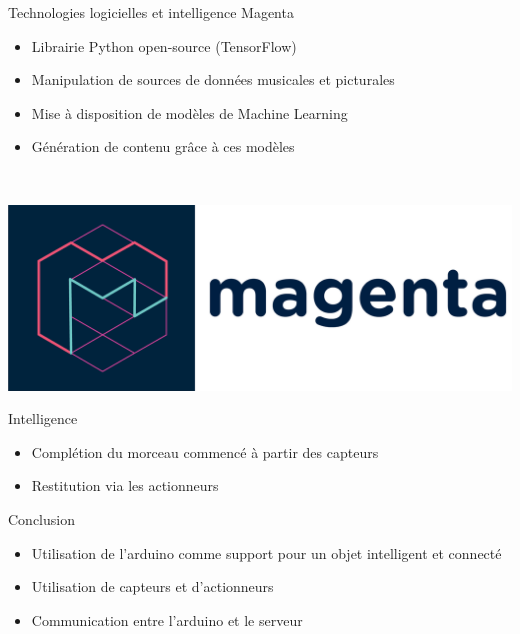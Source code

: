 \documentclass[11pt]{beamer}
\begin{document}
\begin{frame}{Technologies logicielles et intelligence}
Magenta
\begin{itemize}
    \item Librairie Python open-source (TensorFlow) 
    \item Manipulation de sources de données musicales et picturales
    \item Mise à disposition de modèles de Machine Learning
    \item Génération de contenu grâce à ces modèles
\end{itemize}
~\\
\begin{center}
    \includegraphics[scale=0.05]{logo-magenta.png}
\end{center}

Intelligence
\begin{itemize}
    \item Complétion du morceau commencé à partir des capteurs
    \item Restitution via les actionneurs
\end{itemize}
    
\end{frame}

\begin{frame}{Conclusion}
\begin{itemize}
    \item Utilisation de l'arduino comme support pour un objet intelligent et connecté
    \item Utilisation de capteurs et d'actionneurs
    \item Communication entre l'arduino et le serveur
\end{itemize}
\end{frame}
\end{document}
